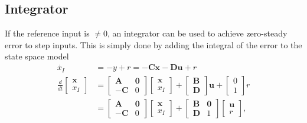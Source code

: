\subsection{Integrator}
If the reference input is $\neq 0$, an integrator can be used to achieve zero-steady error to step inputs.
This is simply done by adding the integral of the error to the state space model
\noindent\begin{align*}
    \dot{x_I} & =-y+r =  -\mathbf{Cx} - \mathbf{Du} + r \\
    \frac d{dt}
    \begin{bmatrix}
        \mathbf{x} \\
        x_I
    \end{bmatrix}
              & =\begin{bmatrix}
                     \mathbf{A}  & \mathbf{0} \\
                     -\mathbf{C} & 0
                 \end{bmatrix}
    \begin{bmatrix}
        \mathbf{x} \\
        x_I
    \end{bmatrix}
    +\begin{bmatrix}
         \mathbf{B} \\
         \mathbf{D}
     \end{bmatrix}
    \mathbf{u}+
    \begin{bmatrix}
        0 \\
        1
    \end{bmatrix}
    r                                                   \\
              & =\begin{bmatrix}
                     \mathbf{A}  & \mathbf{0} \\
                     -\mathbf{C} & 0
                 \end{bmatrix}
    \begin{bmatrix}
        \mathbf{x} \\
        x_I
    \end{bmatrix}
    +\begin{bmatrix}
         \mathbf{B} & \mathbf{0} \\
         \mathbf{D} & 1
     \end{bmatrix}
    \begin{bmatrix}
        \mathbf{u} \\
        r
    \end{bmatrix},
\end{align*}
